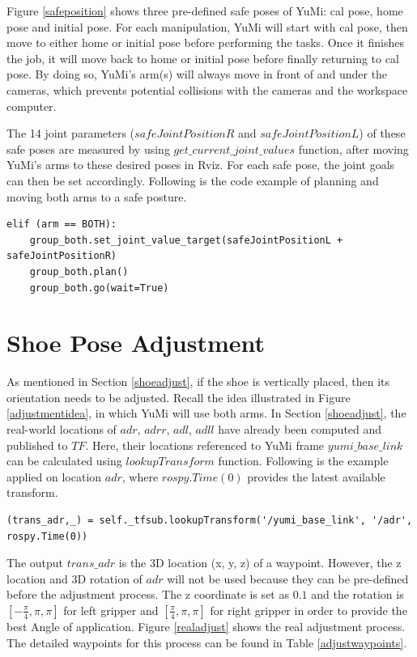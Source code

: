 Figure \ref{safeposition} shows three pre-defined safe poses of YuMi: cal pose, home pose and initial pose. For each manipulation, YuMi will start with cal pose, then move to either home or initial pose before performing the tasks. Once it finishes the job, it will move back to home or initial pose before finally returning to cal pose. By doing so, YuMi's arm(s) will always move in front of and under the cameras, which prevents potential collisions with the cameras and the workspace computer.

The 14 joint parameters ($safeJointPositionR$ and $safeJointPositionL$) of these safe poses are measured by using $get\_current\_joint\_values$ function, after moving YuMi's arms to
these desired poses in Rviz. For each safe pose, the joint goals can then be set accordingly. Following is the code example of planning and moving both arms to a safe posture.

\begin{verbatim}
elif (arm == BOTH):
    group_both.set_joint_value_target(safeJointPositionL + safeJointPositionR)
    group_both.plan()
    group_both.go(wait=True)
\end{verbatim}

\section{Shoe Pose Adjustment} \label{adj}
As mentioned in Section \ref{shoeadjust}, if the shoe is vertically placed, then its orientation needs to be adjusted. Recall the idea illustrated in Figure \ref{adjustmentidea}, in which YuMi will use both arms. In Section \ref{shoeadjust}, the real-world locations of $adr$, $adrr$, $adl$, $adll$ have already been computed and published to $TF$.
Here, their locations referenced to YuMi frame $yumi\_base\_link$ can be calculated using $lookupTransform$ function. Following is the example applied on location $adr$, where $rospy.Time(0)$ provides the latest available transform.

\begin{verbatim}
(trans_adr,_) = self._tfsub.lookupTransform('/yumi_base_link', '/adr', rospy.Time(0))
\end{verbatim}

The output $trans\_adr$ is the 3D location (x, y, z) of a waypoint. However, the z location and 3D rotation of $adr$ will not be used because they can be pre-defined before the adjustment process. The z coordinate is set as $0.1$ and the rotation is $[-\frac{\pi}{4}, \pi, \pi]$ for left gripper and $[\frac{\pi}{4}, \pi, \pi]$ for right gripper in order to provide the best Angle of application. Figure \ref{realadjust} shows the real adjustment process. The detailed waypoints for this process can be found in Table \ref{adjustwaypoints}.

